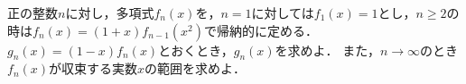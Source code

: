 \documentclass[../../main.tex]{subfiles}
\begin{document}
正の整数$n$に対し，多項式$f_n(x)$を，$n=1$に対しては$f_1(x)=1$とし，$n\ge 2$の時は$f_n(x)=(1+x)f_{n-1}(x^2)$で帰納的に定める．
$g_n(x)=(1-x)f_n(x)$とおくとき，$g_n(x)$を求めよ．
また，$n\to\infty$のとき$f_n(x)$が収束する実数$x$の範囲を求めよ．
\end{document}
